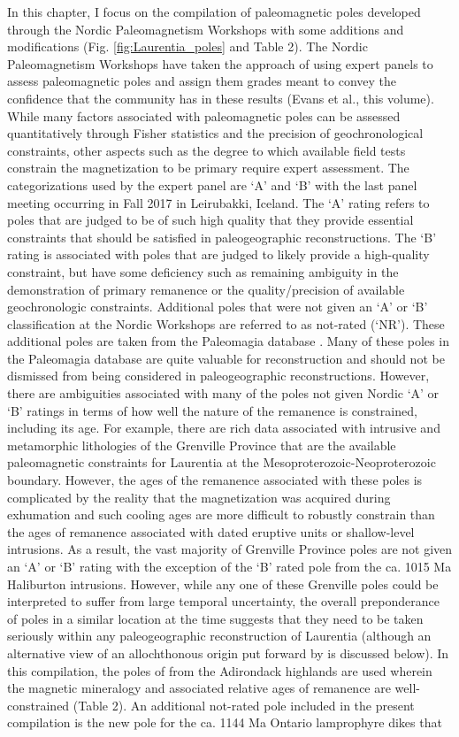 \documentclass[11pt,letterpaper]{article}
\begin{document}
In this chapter, I focus on the compilation of paleomagnetic poles developed through the Nordic Paleomagnetism Workshops with some additions and modifications (Fig. \ref{fig:Laurentia_poles} and Table 2). The Nordic Paleomagnetism Workshops have taken the approach of using expert panels to assess paleomagnetic poles and assign them grades meant to convey the confidence that the community has in these results (Evans et al., this volume). While many factors associated with paleomagnetic poles can be assessed quantitatively through Fisher statistics and the precision of geochronological constraints, other aspects such as the degree to which available field tests constrain the magnetization to be primary require expert assessment. The categorizations used by the expert panel are `A' and `B' with the last panel meeting occurring in Fall 2017 in Leirubakki, Iceland. The `A' rating refers to poles that are judged to be of such high quality that they provide essential constraints that should be satisfied in paleogeographic reconstructions. The `B' rating is associated with poles that are judged to likely provide a high-quality constraint, but have some deficiency such as remaining ambiguity in the demonstration of primary remanence or the quality/precision of available geochronologic constraints. Additional poles that were not given an `A' or `B' classification at the Nordic Workshops are referred to as not-rated (`NR'). These additional poles are taken from the Paleomagia database \citep{Veikkolainen2014a}. Many of these poles in the Paleomagia database are quite valuable for reconstruction and should not be dismissed from being considered in paleogeographic reconstructions. However, there are ambiguities associated with many of the poles not given Nordic `A' or `B' ratings in terms of how well the nature of the remanence is constrained, including its age. For example, there are rich data associated with intrusive and metamorphic lithologies of the Grenville Province that are the available paleomagnetic constraints for Laurentia at the Mesoproterozoic-Neoproterozoic boundary. However, the ages of the remanence associated with these poles is complicated by the reality that the magnetization was acquired during exhumation and such cooling ages are more difficult to robustly constrain than the ages of remanence associated with dated eruptive units or shallow-level intrusions. As a result, the vast majority of Grenville Province poles are not given an `A' or `B' rating with the exception of the `B' rated pole from the ca. 1015 Ma Haliburton intrusions. However, while any one of these Grenville poles could be interpreted to suffer from large temporal uncertainty, the overall preponderance of poles in a similar location at the time suggests that they need to be taken seriously within any paleogeographic reconstruction of Laurentia (although an alternative view of an allochthonous origin put forward by \citet{Halls2015a} is discussed below). In this compilation, the poles of \cite{Brown2012a} from the Adirondack highlands are used wherein the magnetic mineralogy and associated relative ages of remanence are well-constrained (Table 2). An additional not-rated pole included in the present compilation is the new pole for the ca. 1144 Ma Ontario lamprophyre dikes \citep{Piispa2018a} that 
\end{document}
